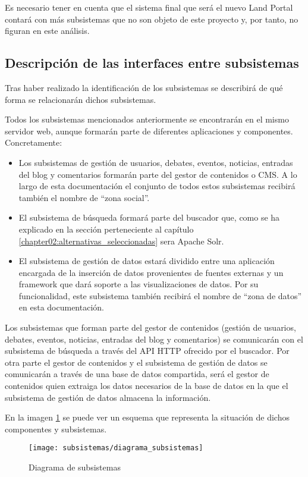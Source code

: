 Es necesario tener en cuenta que el sistema final que será el nuevo Land Portal contará con más subsistemas que no son objeto de este proyecto y, por tanto, no figuran en este análisis.


\subsection{Descripción de las interfaces entre subsistemas}
Tras haber realizado la identificación de los subsistemas  se describirá de qué forma se relacionarán dichos subsistemas.

Todos los subsistemas mencionados anteriormente se encontrarán en el mismo servidor web, aunque formarán parte de diferentes aplicaciones y componentes.  Concretamente:
\begin{itemize}
\item Los subsistemas de gestión de usuarios, debates, eventos, noticias, entradas del blog y comentarios formarán parte del gestor de contenidos o CMS.  A lo largo de esta documentación el conjunto de todos estos subsistemas recibirá también el nombre de ``zona social''.
\item El subsistema de búsqueda formará parte del buscador que, como se ha explicado en la sección  perteneciente al capítulo \ref{chapter02:alternativas_seleccionadas} sera Apache Solr.
\item El subsistema de gestión de datos estará dividido entre una aplicación encargada de la inserción de datos provenientes de fuentes externas y un framework que dará soporte a las visualizaciones de datos.  Por su funcionalidad, este subsistema también recibirá el nombre de ``zona de datos'' en esta documentación.
\end{itemize}

Los subsistemas que forman parte del gestor de contenidos (gestión de usuarios, debates, eventos, noticias, entradas del blog y comentarios) se comunicarán con el subsistema de búsqueda a través del API HTTP ofrecido por el buscador. \newline
Por otra parte el gestor de contenidos y el subsistema de gestión de datos se comunicarán a través de una base de datos compartida, será el gestor de contenidos quien extraiga los datos necesarios de la base de datos en la que el subsistema de gestión de datos almacena la información.

En la imagen \ref{fig:diagrama_subsistemas} se puede ver un esquema que representa la situación de dichos componentes y subsistemas.

\begin{figure}[h]
\centering
\texttt{[image: subsistemas/diagrama\_subsistemas]}
\caption{Diagrama de subsistemas}
\label{fig:diagrama_subsistemas}
\end{figure}